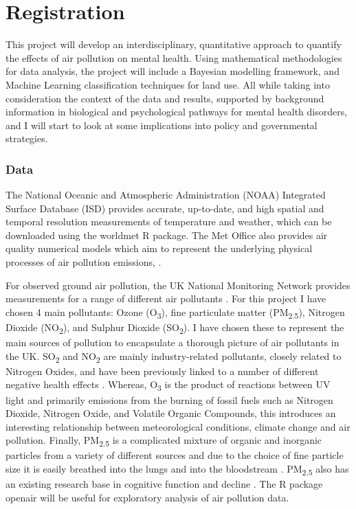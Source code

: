 \chapter{Registration}

This project will develop an interdisciplinary, quantitative approach to quantify the effects of air pollution on mental health. Using mathematical methodologies for data analysis, the project will include a Bayesian modelling framework, and Machine Learning classification techniques for land use. All while taking into consideration the context of the data and results, supported by background information in biological and psychological pathways for mental health disorders, and I will start to look at some implications into policy and governmental strategies.

\subsection{Data}
The National Oceanic and Atmospheric Administration (NOAA) Integrated Surface
Database (ISD) \citep{NationalCentresforEnvironmentalInformationGlobalISD} provides accurate, up-to-date, and high spatial and temporal resolution measurements of temperature and weather, which can be downloaded using the worldmet R package. The Met Office also provides air quality numerical models which aim to represent the underlying physical processes of air pollution emissions, \citep{AirOffice}.

For observed ground air pollution, the UK National Monitoring Network provides measurements for a range of different air pollutants \citep{DepartmentforEnvironmentMonitoringUK}. For this project I have chosen 4 main pollutants: Ozone (O\textsubscript{3}), fine particulate matter (PM\textsubscript{2.5}), Nitrogen Dioxide (NO\textsubscript{2}), and Sulphur Dioxide (SO\textsubscript{2}). I have chosen these to represent the main sources of pollution to encapsulate a thorough picture of air pollutants in the UK. SO\textsubscript{2} and NO\textsubscript{2} are mainly industry-related pollutants, closely related to Nitrogen Oxides, and have been previously linked to a number of different negative health effects \citep{Azimi2018Air2015}. Whereas, O\textsubscript{3} is the product of reactions between UV light and primarily emissions from the burning of fossil fuels such as Nitrogen Dioxide, Nitrogen Oxide, and Volatile Organic Compounds, this introduces an interesting relationship between meteorological conditions, climate change and air pollution. Finally, PM\textsubscript{2.5} is a complicated mixture of organic and inorganic particles from a variety of different sources and due to the choice of fine particle size it is easily breathed into the lungs and into the bloodstream \citep{Bell2007SpatialStudies}. PM\textsubscript{2.5} also has an existing research base in cognitive function and decline \citep[e.g.][]{Delgado-Saborit2021APopulation}. The R package openair will be useful for exploratory analysis  of air pollution data.

